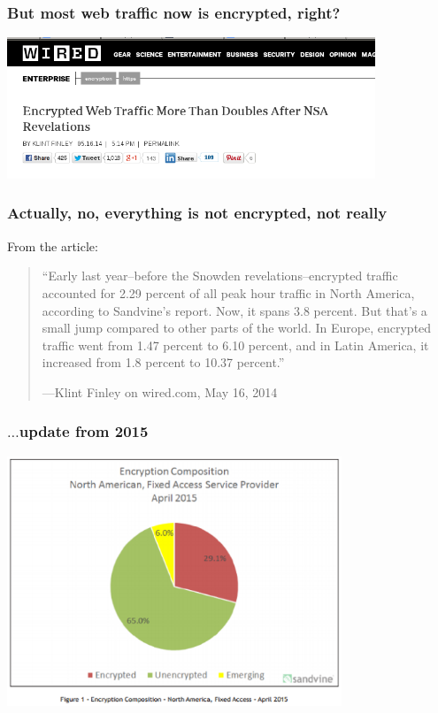 \begin{frame}
  \frametitle{But most web traffic now is encrypted, right?}
  {
    \begin{center}
      \includegraphics[width=11cm]{webencrypt}
    \end{center}
  }
\end{frame}

\addtocounter{framenumber}{-1}
\begin{frame}
  \frametitle{Actually, no, everything is not encrypted, not really}
  From the article:\\[.3cm]

  \begin{quotation}
    ``Early last year–before the Snowden revelations–encrypted traffic accounted for 2.29 percent of all peak hour traffic in North America, 
    according to Sandvine’s report. Now, it spans 3.8 percent. But that’s a small jump compared to other parts of the world. 
    In Europe, encrypted traffic went from 1.47 percent to 6.10 percent, and in Latin America, it increased from 1.8 percent to 10.37 percent.''\\
    \hfill{\raggedright---Klint Finley on wired.com, May 16, 2014} %
  \end{quotation}
\end{frame}

\begin{frame}
  \frametitle{$\dots$update from 2015}
  \begin{center}
    \includegraphics[width=10cm]{webencrypt2015}
  \end{center}
\end{frame}

